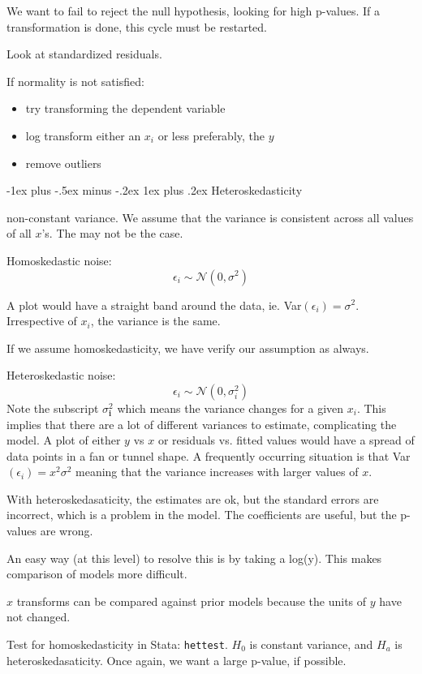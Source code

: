 \documentclass[10pt,landscape]{article}
\makeatletter
\renewcommand{\subsubsection}{\@startsection{subsubsection}{3}{0mm}%
                                {-1ex plus -.5ex minus -.2ex}%
                                {1ex plus .2ex}%
                                {\normalfont\small\bfseries}}
\makeatother
\begin{document}
\begin{multicols*}{3}
We want to fail to reject the null hypothesis, looking for high p-values. If a transformation is done, this cycle must be restarted.

Look at standardized residuals.

If normality is not satisfied:
\begin{itemize}
\item{try transforming the dependent variable}
\item{log transform either an $x_i$ or less preferably, the $y$}
\item{remove outliers}
\end{itemize}

\subsubsection{Heteroskedasticity}

non-constant variance. We assume that the variance is consistent across all values of all $x$'s. The may not be the case.

Homoskedastic noise:
\[
\epsilon_i \sim \mathcal{N}(0,\sigma^2)
\]

A plot would have a straight band around the data, ie. Var$(\epsilon_i) = \sigma^2$. Irrespective of $x_i$, the variance is the same.

If we assume homoskedasticity, we have verify our assumption as always.

Heteroskedastic noise:
\[
\epsilon_i \sim \mathcal{N}(0,\sigma^2_i)
\]
Note the subscript $\sigma^2_\textbf{i}$ which means the variance changes for a given $x_i$. This implies that there are a lot of different variances to estimate, complicating the model. A plot of either $y$ vs $x$ or residuals vs. fitted values would have a spread of data points in a fan or tunnel shape. A frequently occurring situation is that Var$(\epsilon_i) = x^2\sigma^2$ meaning that the variance increases with larger values of $x$.

With heteroskedasaticity, the estimates are ok, but the standard errors are incorrect, which is a problem in the model. The coefficients are useful, but the p-values are wrong.

An easy way (at this level) to resolve this is by taking a log(y). This makes comparison of models more difficult.

$x$ transforms can be compared against prior models because the units of $y$ have not changed.

Test for homoskedasticity in Stata: \texttt{hettest}. $H_0$ is constant variance, and $H_a$ is heteroskedasaticity. Once again, we want a large p-value, if possible.


\end{multicols*}
\end{document}
